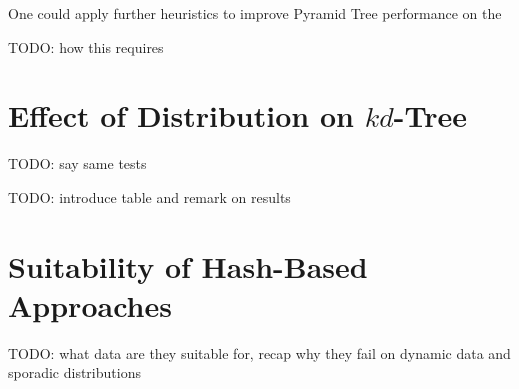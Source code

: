 One could apply further heuristics to improve Pyramid Tree performance on the 

TODO: how this requires 

\section{Effect of Distribution on $kd$-Tree}

TODO: say same tests

TODO: introduce table and remark on results

\begin{table}
	\centering
	\caption{Point $kd$-Tree Statistics with Different Dimensions of Astrophysics Dataset}
	\label{tab:final-balance-factor}
\end{table}

\section{Suitability of Hash-Based Approaches}

TODO: what data are they suitable for, recap why they fail on dynamic data and sporadic distributions